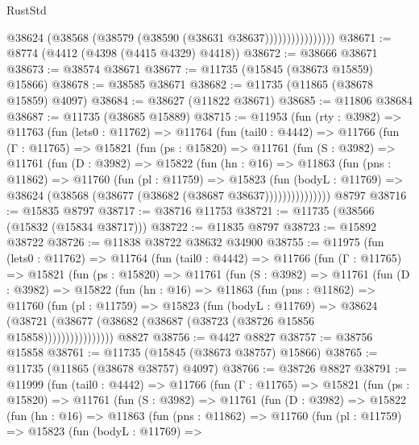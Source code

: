 \begin{lexlean}{RustStd}
\begin{coremodule}
                          @38624 (@38568 (@38579 (@38590 (@38631 @38637))))))))))))))))
@38671 := @8774 (@4412 (@4398 (@4415 @4329) @4418))
@38672 := @38666 @38671
@38673 := @38574 @38671
@38677 := @11735 (@15845 (@38673 @15859) @15866)
@38678 := @38585 @38671
@38682 := @11735 (@11865 (@38678 @15859) @4097)
@38684 := @38627 (@11822 @38671)
@38685 := @11806 @38684
@38687 := @11735 (@38685 @15889)
@38715 := @11953
    (fun (rty : @3982) =>
    @11763
      (fun (lets0 : @11762) =>
      @11764
        (fun (tail0 : @4442) =>
        @11766
          (fun (Γ : @11765) =>
          @15821
            (fun (ps : @15820) =>
            @11761
              (fun (S : @3982) =>
              @11761
                (fun (D : @3982) =>
                @15822
                  (fun (hn : @16) =>
                  @11863
                    (fun (pns : @11862) =>
                    @11760
                      (fun (pl : @11759) =>
                      @15823
                        (fun (bodyL : @11769) =>
                        @38624 (@38568 (@38677 (@38682 (@38687 @38637)))))))))))))))
    @8797
@38716 := @15835 @8797
@38717 := @38716 @11753
@38721 := @11735 (@38566 (@15832 (@15834 @38717)))
@38722 := @11835 @8797
@38723 := @15892 @38722
@38726 := @11838 @38722 @38632 @34900
@38755 := @11975
    (fun (lets0 : @11762) =>
    @11764
      (fun (tail0 : @4442) =>
      @11766
        (fun (Γ : @11765) =>
        @15821
          (fun (ps : @15820) =>
          @11761
            (fun (S : @3982) =>
            @11761
              (fun (D : @3982) =>
              @15822
                (fun (hn : @16) =>
                @11863
                  (fun (pns : @11862) =>
                  @11760
                    (fun (pl : @11759) =>
                    @15823
                      (fun (bodyL : @11769) =>
                      @38624
                        (@38721
                          (@38677 (@38682 (@38687 (@38723 (@38726 @15856 @15858))))))))))))))))
    @8827
@38756 := @4427 @8827
@38757 := @38756 @15858
@38761 := @11735 (@15845 (@38673 @38757) @15866)
@38765 := @11735 (@11865 (@38678 @38757) @4097)
@38766 := @38726 @8827
@38791 := @11999
    (fun (tail0 : @4442) =>
    @11766
      (fun (Γ : @11765) =>
      @15821
        (fun (ps : @15820) =>
        @11761
          (fun (S : @3982) =>
          @11761
            (fun (D : @3982) =>
            @15822
              (fun (hn : @16) =>
              @11863
                (fun (pns : @11862) =>
                @11760
                  (fun (pl : @11759) =>
                  @15823
                    (fun (bodyL : @11769) =>

\end{coremodule}
\end{lexlean}
